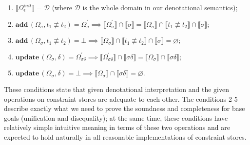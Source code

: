 \documentclass[submission,copyright,creativecommons]{eptcs}
\newtheorem{theorem}{Theorem}
\newcommand{\sembr}[1]{\llbracket{#1}\rrbracket}
\newcommand{\diseq}{\not\equiv}
\newcommand{\reprfunset}{\mathcal{D}}
\newcommand{\cstore}{\Omega}
\newcommand{\cstoreinit}{\cstore_\epsilon^{init}}
\newcommand{\csadd}[3]{\mathbf{add}\,(#1, #2 \diseq #3)}  %
\newcommand{\csupdate}[2]{\mathbf{update}\,(#1, #2)}  %
\let\emptyset\varnothing
\begin{document}




\begin{enumerate}
\item $\sembr{\cstoreinit} = \reprfunset$ (where $\reprfunset$ is the whole domain in our denotational semantics);
\item $\csadd{\cstore_\sigma}{t_1}{t_2} = \cstore^\prime_\sigma \implies \sembr{\cstore^\prime_\sigma} \cap \sembr{\sigma} = \sembr{\cstore_\sigma} \cap \sembr{t_1 \diseq t_2} \cap \sembr{\sigma}$;
\item $\csadd{\cstore_\sigma}{t_1}{t_2} = \bot \implies \sembr{\cstore_\sigma} \cap \sembr{t_1 \diseq t_2} \cap \sembr{\sigma} = \emptyset$;
\item $\csupdate{\cstore_\sigma}{\delta} = \cstore^\prime_{\sigma \delta} \implies \sembr{\cstore^\prime_{\sigma \delta}} \cap \sembr{\sigma \delta} = \sembr{\cstore_\sigma} \cap \sembr{\sigma \delta}$;
\item $\csupdate{\cstore_\sigma}{\delta} = \bot \implies \sembr{\cstore_\sigma} \cap \sembr{\sigma \delta} = \emptyset$.
\end{enumerate}

These conditions state that given denotational interpretation and the given operations on constraint stores are adequate to each other.
The conditions 2-5 describe exactly what we need to prove the soundness and completeness for base goals (unification and disequality); at the same time,
these conditions have relatively simple intuitive meaning in terms of these two operations and are expected to hold naturally in all reasonable
implementations of constraint stores.
\end{document}
